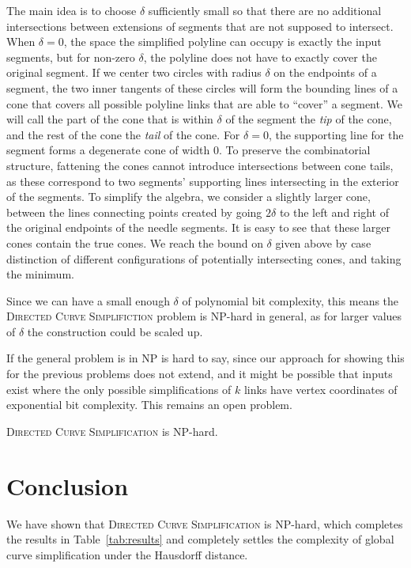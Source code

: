 \documentclass[]{llncs}
\newcommand{\curvesimp}{\textsc{Directed Curve Simplification}\xspace}
\begin{document}
The main idea is to choose $\delta$ sufficiently small so that there are no additional intersections between extensions of segments that are not supposed to intersect. When \(\delta = 0\), the space the simplified polyline can occupy is exactly the input segments, but for non-zero \(\delta\), the polyline does not have to exactly cover the original segment. If we center two circles with radius \(\delta\) on the endpoints of a segment, the two inner tangents of these circles will form the bounding lines of a cone that covers all possible polyline links that are able to ``cover'' a segment. We will call the part of the cone that is within \(\delta\) of the segment the \emph{tip} of the cone, and the rest of the cone the \emph{tail} of the cone. For \(\delta = 0\), the supporting line for the segment forms a degenerate cone of width 0. To preserve the combinatorial structure, fattening the cones cannot introduce intersections between cone tails, as these correspond to two segments' supporting lines intersecting in the exterior of the segments.
To simplify the algebra, we consider a slightly larger cone, between the lines connecting points created by going \(2\delta\) to the left and right of the original endpoints of the needle segments. It is easy to see that these larger cones contain the true cones.
We reach the bound on $\delta$ given above by case distinction of different configurations of potentially intersecting cones, and taking the minimum.

Since we can have a small enough \(\delta\) of polynomial bit complexity, this means the \textsc{Directed Curve Simplifiction} problem is NP-hard in general, as for larger values of \(\delta\) the construction could be scaled up. 

If the general problem is in NP is hard to say, since our approach for showing this for the previous problems does not extend, and it might be possible that inputs exist where the only possible simplifications of $k$ links have vertex coordinates of exponential bit complexity. This remains an open problem.

\begin{theorem}  
\label{thm:finalcellhard}
  \curvesimp is NP-hard.
\end{theorem}  


\section {Conclusion}
We have shown that \curvesimp is NP-hard, which completes the results in Table~\ref {tab:results} and completely settles the complexity of global curve simplification under the Hausdorff distance.
\end{document}
